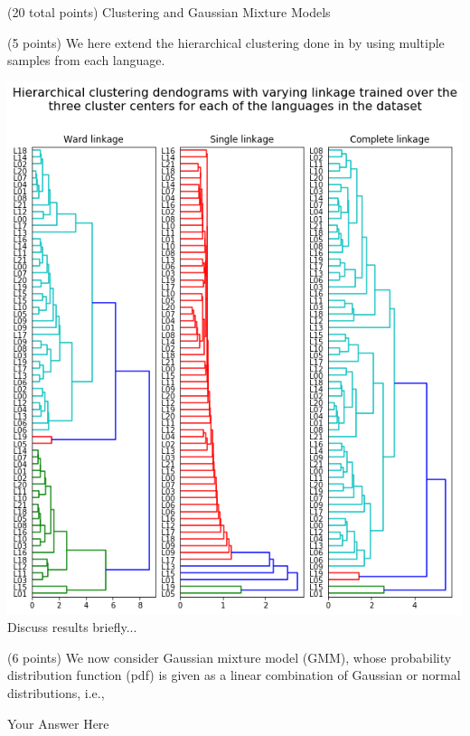 \documentclass[12pt]{article}
\begin{document}
\begin{question}{(20 total points) Clustering and Gaussian Mixture Models}
\begin{subquestion}{(5 points)
       We here extend the hierarchical clustering done in  by
       using multiple samples from each language.
     }
      \begin{answerbox}{55em}
        \includegraphics[width=1\textwidth]{images/q34.png}
        Discuss results briefly...
      \end{answerbox}
  


   \end{subquestion}
   \begin{subquestion}{(6 points)
       We now consider Gaussian mixture model (GMM), whose
       probability distribution function (pdf) is given as
       a linear combination of Gaussian or normal distributions, i.e.,
     } \label{Q3.5}




      \begin{answerbox}{30em}
         Your Answer Here
      \end{answerbox}
  


   \end{subquestion}

   
\end{question}
\end{document}
